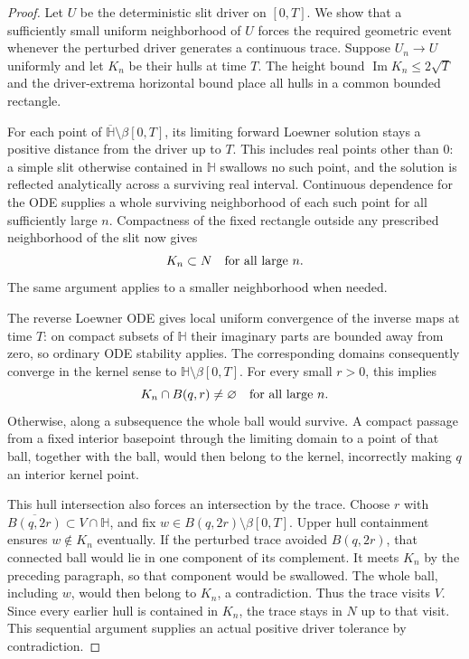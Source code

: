 \begin{proof}
Let $U$ be the deterministic slit driver on $[0,T]$.  We show that a
sufficiently small uniform neighborhood of $U$ forces the required
geometric event whenever the perturbed driver generates a continuous
trace.  Suppose $U_n\to U$ uniformly and let $K_n$ be their hulls at
time $T$.  The height bound $\operatorname{Im}K_n\le2\sqrt T$ and
the driver-extrema horizontal bound place all hulls in a common
bounded rectangle.

For each point of
$\overline{\mathbb H}\setminus\beta[0,T]$, its limiting forward
Loewner solution stays a positive distance from the driver up to
$T$.  This includes real points other than $0$: a simple slit
otherwise contained in $\mathbb H$ swallows no such point, and the
solution is reflected analytically across a surviving real interval.
Continuous dependence for the ODE supplies a whole surviving
neighborhood of each such point for all sufficiently large $n$.
Compactness of the fixed rectangle outside any prescribed neighborhood
of the slit now gives
\[
                  K_n\subset N\quad\hbox{for all large }n.
\]
The same argument applies to a smaller neighborhood when needed.

The reverse Loewner ODE gives local uniform convergence of the
inverse maps at time $T$: on compact subsets of $\mathbb H$ their
imaginary parts are bounded away from zero, so ordinary ODE
stability applies.  The corresponding domains consequently converge
in the kernel sense to $\mathbb H\setminus\beta[0,T]$.  For every
small $r>0$, this implies
\[
                 K_n\cap B(q,r)\ne\varnothing
                 \quad\hbox{for all large }n.
\]
Otherwise, along a subsequence the whole ball would survive.  A
compact passage from a fixed interior basepoint through the limiting
domain to a point of that ball, together with the ball, would then
belong to the kernel, incorrectly making $q$ an interior kernel
point.

This hull intersection also forces an intersection by the trace.
Choose $r$ with $\overline{B(q,2r)}\subset V\cap\mathbb H$, and
fix $w\in B(q,2r)\setminus\beta[0,T]$.  Upper hull containment
ensures $w\notin K_n$ eventually.  If the perturbed trace avoided
$B(q,2r)$, that connected ball would lie in one component of its
complement.  It meets $K_n$ by the preceding paragraph, so that
component would be swallowed.  The whole ball, including $w$, would
then belong to $K_n$, a contradiction.  Thus the trace visits $V$.
Since every earlier hull is contained in $K_n$, the trace stays in
$N$ up to that visit.  This sequential argument supplies an actual
positive driver tolerance by contradiction.


\end{proof}
